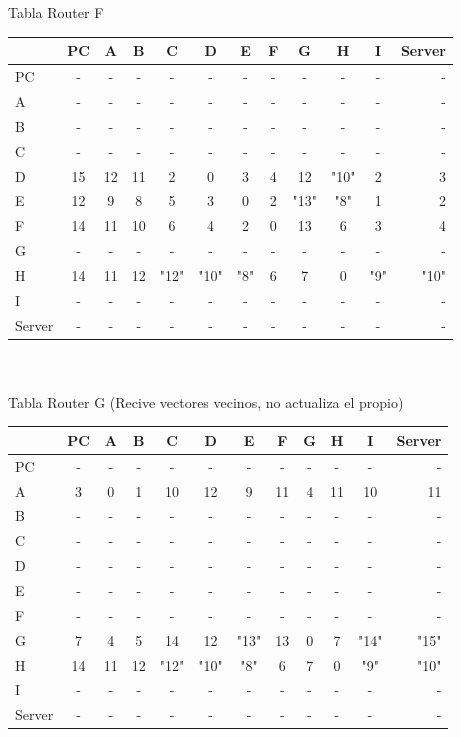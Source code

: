 \documentclass{article}
\begin{document}
\\
\\
Tabla Router F \\
\begin{tabular}{l*{10}{c}r}
              & PC & A & B & C & D & E & F & G & H & I & Server \\
\hline
PC             & - & - & - & - & - & - & - & - & - & - & -\\
A              & - & - & - & - & - & - & - & - & - & - & -\\
B              & - & - & - & - & - & - & - & - & - & - & -\\
C              & - & - & - & - & - & - & - & - & - & - & -\\
D              & 15 & 12 & 11 & 2 & 0 & 3 & 4 & 12 & "10" & 2 & 3\\
E              & 12 & 9 & 8 & 5 & 3 & 0 & 2 & "13" & "8" & 1 & 2\\
F              & 14 & 11 & 10 & 6 & 4 & 2 & 0 & 13 & 6 & 3 & 4\\
G              & - & - & - & - & - & - & - & - & - & - & -\\
H              & 14 & 11 & 12 & "12" & "10" & "8" & 6 & 7 & 0 & "9" & "10"\\
I              & - & - & - & - & - & - & - & - & - & - & -\\
Server         & - & - & - & - & - & - & - & - & - & - & -\\

\end{tabular}
\\
\\
Tabla Router G (Recive vectores vecinos, no actualiza el propio) \\
\begin{tabular}{l*{10}{c}r}
              & PC & A & B & C & D & E & F & G & H & I & Server \\
\hline
PC             & - & - & - & - & - & - & - & - & - & - & -\\
A              & 3 & 0 & 1 & 10 & 12 & 9 & 11 & 4 & 11 & 10 & 11 \\
B              & - & - & - & - & - & - & - & - & - & - & -\\
C              & - & - & - & - & - & - & - & - & - & - & -\\
D              & - & - & - & - & - & - & - & - & - & - & -\\
E              & - & - & - & - & - & - & - & - & - & - & -\\
F              & - & - & - & - & - & - & - & - & - & - & -\\
G              & 7 & 4 & 5 & 14 & 12 & "13" & 13 & 0 & 7 & "14" & "15"\\
H              & 14 & 11 & 12 & "12" & "10" & "8" & 6 & 7 & 0 & "9" & "10"\\
I              & - & - & - & - & - & - & - & - & - & - & -\\
Server         & - & - & - & - & - & - & - & - & - & - & -\\

\end{tabular}
\end{document}
